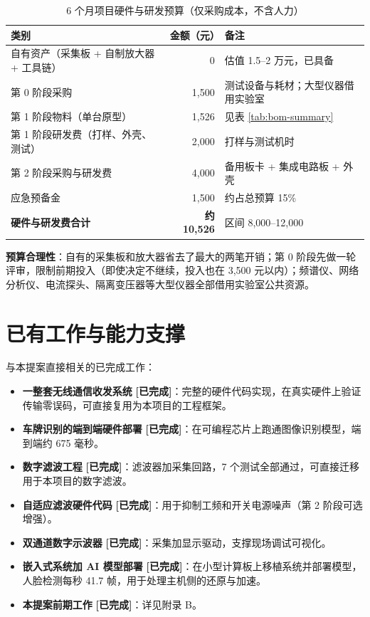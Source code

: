 \documentclass[a4paper,11pt,oneside,UTF8,scheme=plain]{ctexart}
\newcommand{\statusok}{\textbf{[已完成]}}
\begin{document}
\begin{table}[H]
\centering
\caption{6 个月项目硬件与研发预算（仅采购成本，不含人力）}
\label{tab:total-budget}
\footnotesize
\begin{tabularx}{\textwidth}{l r>{\raggedright\arraybackslash}X}
\toprule
\rowcolor{tableheader}
\textbf{类别} & \textbf{金额（元）} & \textbf{备注} \\
\midrule
自有资产（采集板 + 自制放大器 + 工具链） & 0 & 估值 1.5--2 万元，已具备 \\
第 0 阶段采购 & 1{,}500 & 测试设备与耗材；大型仪器借用实验室 \\
第 1 阶段物料（单台原型） & 1{,}526 & 见表 \ref{tab:bom-summary} \\
第 1 阶段研发费（打样、外壳、测试） & 2{,}000 & 打样与测试机时 \\
第 2 阶段采购与研发费 & 4{,}000 & 备用板卡 + 集成电路板 + 外壳 \\
应急预备金 & 1{,}500 & 约占总预算 15\% \\
\textbf{硬件与研发费合计} & \textbf{约 10{,}526} & 区间 8{,}000--12{,}000 \\
\bottomrule
\end{tabularx}
\end{table}

\textbf{预算合理性}：自有的采集板和放大器省去了最大的两笔开销；第 0 阶段先做一轮评审，限制前期投入（即使决定不继续，投入也在 3{,}500 元以内）；频谱仪、网络分析仪、电流探头、隔离变压器等大型仪器全部借用实验室公共资源。

\appendix

\section{已有工作与能力支撑}
\label{sec:appA}

与本提案直接相关的已完成工作：

\begin{itemize}\setlength\itemsep{0.15em}
\item \textbf{一整套无线通信收发系统} \statusok：完整的硬件代码实现，在真实硬件上验证传输零误码，可直接复用为本项目的工程框架。
\item \textbf{车牌识别的端到端硬件部署} \statusok：在可编程芯片上跑通图像识别模型，端到端约 675 毫秒。
\item \textbf{数字滤波工程} \statusok：滤波器加采集回路，7 个测试全部通过，可直接迁移用于本项目的数字滤波。
\item \textbf{自适应滤波硬件代码} \statusok：用于抑制工频和开关电源噪声（第 2 阶段可选增强）。
\item \textbf{双通道数字示波器} \statusok：采集加显示驱动，支撑现场调试可视化。
\item \textbf{嵌入式系统加 AI 模型部署} \statusok：在小型计算板上移植系统并部署模型，人脸检测每秒 41.7 帧，用于处理主机侧的还原与加速。
\item \textbf{本提案前期工作} \statusok：详见附录 B。
\end{itemize}
\end{document}
